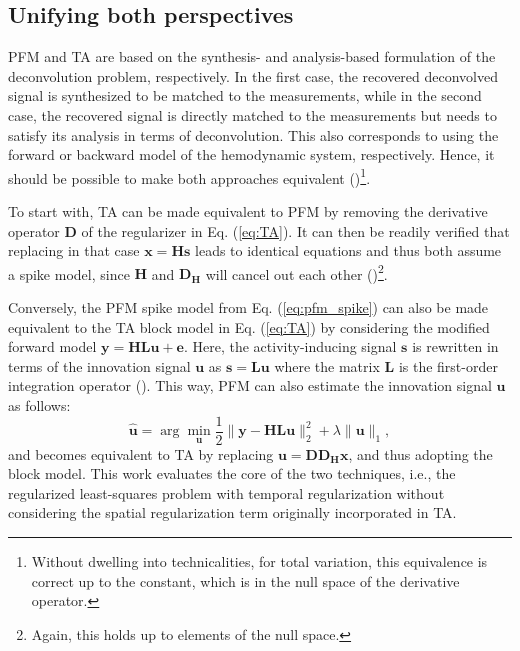 \subsection{Unifying both perspectives}

PFM and TA are based on the synthesis- and analysis-based formulation of the deconvolution problem, respectively. In the first case, the recovered deconvolved signal is synthesized to be matched to the measurements, while in the second case, the recovered signal is directly matched to the measurements but needs to satisfy its analysis in terms of deconvolution. This also corresponds to using the forward or backward model of the hemodynamic system, respectively. Hence, it should be possible to make both approaches equivalent (\citealt{Elad2007Analysisversussynthesis})\footnote{Without dwelling into technicalities, for total variation, this equivalence is correct up to the constant, which is in the null space of the derivative operator.}.

To start with, TA can be made equivalent to PFM by removing the derivative operator $\mathbf{D}$ of the regularizer in Eq. (\ref{eq:TA}). It can then be readily verified that replacing in that case $\mathbf{x}=\mathbf{Hs}$ leads to identical equations and thus both assume a spike model, since $\mathbf{H}$ and $\mathbf{D_H}$ will cancel out each other (\citealt{Karahanoglu2011SignalProcessingApproach})\footnote{Again, this holds up to elements of the null space.}.

Conversely, the PFM spike model from Eq. (\ref{eq:pfm_spike}) can also be made equivalent to the TA block model in Eq. (\ref{eq:TA}) by considering the modified forward model $\mathbf{y} = \mathbf{H L u} + \mathbf{e}$. Here, the activity-inducing signal $\mathbf{s}$ is rewritten in terms of the innovation signal $\mathbf{u}$ as $\mathbf{s}=\mathbf{Lu}$ where the matrix $\mathbf{L}$ is the first-order integration operator (\citealt{Cherkaoui2019SparsitybasedBlind,Urunuela2020StabilityBasedSparse}). This way, PFM can also estimate the innovation signal $\mathbf{u}$ as follows: 
\begin{equation}
    \label{eq:pfm_block}
    \hat{\mathbf{u}} = \arg \min_{\mathbf{u}} \frac{1}{2} \| \mathbf{y} - \mathbf{HLu} \|_2^2 + \lambda \| \mathbf{u} \|_1,
\end{equation}
and becomes equivalent to TA by replacing $\mathbf{u}=\mathbf{D D_H x}$, and thus adopting the block model. This work evaluates the core of the two techniques, i.e., the regularized least-squares problem with temporal regularization without considering the spatial regularization term originally incorporated in TA.

